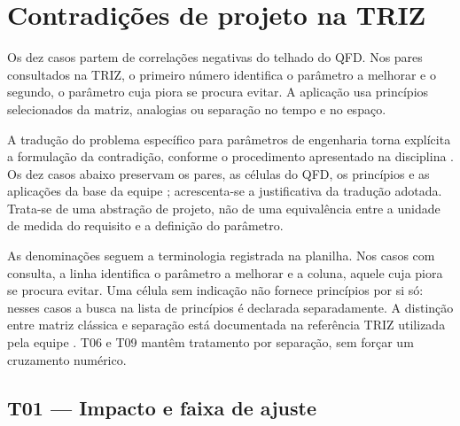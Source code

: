 \section{Contradições de projeto na TRIZ}
Os dez casos partem de correlações negativas do telhado do QFD. Nos pares consultados na TRIZ, o primeiro número identifica o parâmetro a melhorar e o segundo, o parâmetro cuja piora se procura evitar. A aplicação usa princípios selecionados da matriz, analogias ou separação no tempo e no espaço.

A tradução do problema específico para parâmetros de engenharia torna explícita a formulação da contradição, conforme o procedimento apresentado na disciplina \citep[slides~27--30, 35, 37]{aula17}. Os dez casos abaixo preservam os pares, as células do QFD, os princípios e as aplicações da base da equipe \citep{baseequipe2026}; acrescenta-se a justificativa da tradução adotada. Trata-se de uma abstração de projeto, não de uma equivalência entre a unidade de medida do requisito e a definição do parâmetro.

As denominações seguem a terminologia registrada na planilha. Nos casos com consulta, a linha identifica o parâmetro a melhorar e a coluna, aquele cuja piora se procura evitar. Uma célula sem indicação não fornece princípios por si só: nesses casos a busca na lista de princípios é declarada separadamente. A distinção entre matriz clássica e separação está documentada na referência TRIZ utilizada pela equipe \citep{dtoceantriz}. T06 e T09 mantêm tratamento por separação, sem forçar um cruzamento numérico.

\subsection{T01 — Impacto e faixa de ajuste}

